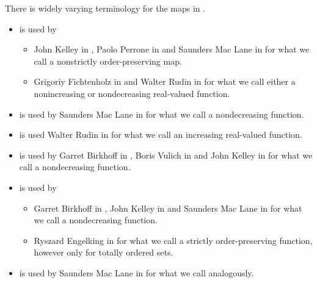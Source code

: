 \begin{remark}\label{rem:order_homomorphism_terminology}
  There is widely varying terminology for the maps in .

  \begin{itemize}
    \item {} is used by
    \begin{itemize}
      \item John Kelley in \cite[3]{Kelley1975}, Paolo Perrone in \cite[exmpl. 1.5.9]{Perrone2019} and Saunders Mac Lane in \cite[92]{MacLane1998} for what we call a nonstrictly order-preserving map.
      \item Grigoriy Fichtenholz in \cite[№47]{ФихтенгольцОсновыТом1} and Walter Rudin in \cite[def. 4.28]{Rudin1976Principles} for what we call either a nonincreasing or nondecreasing real-valued function.
    \end{itemize}

    \item {} is used by Saunders Mac Lane in \cite[175]{MacLane1998} for what we call a nondecreasing function.

    \item {} is used Walter Rudin in \cite[def. 4.28]{Rudin1976Principles} for what we call an increasing real-valued function.

    \item {} is used by Garret Birkhoff in \cite[3]{Birkhoff1948}, Boris Vulich in \cite[def. 1.7.1]{Вулих1961} and John Kelley in \cite[3]{Kelley1975} for what we call a nondecreasing function.

    \item {} is used by
    \begin{itemize}
       \item Garret Birkhoff in \cite[3]{Birkhoff1948}, John Kelley in \cite[3]{Kelley1975} and Saunders Mac Lane in \cite[95]{MacLane1998} for what we call a nondecreasing function.

       \item Ryszard Engelking in \cite[4]{Engelking1989} for what we call a strictly order-preserving function, however only for totally ordered sets.
    \end{itemize}

    \item {} is used by Saunders Mac Lane in \cite[95]{MacLane1998} for what we call analogously.


\end{itemize}
\end{remark}
